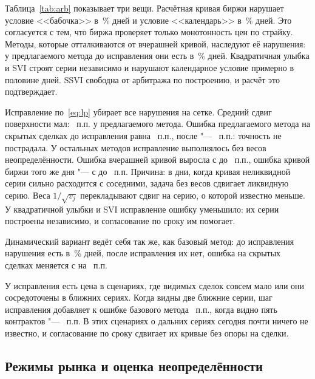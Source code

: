 \documentclass{article}
\begin{document}
Таблица~\ref{tab:arb} показывает три вещи. Расчётная кривая биржи нарушает условие <<бабочка>> в \,\% дней и условие <<календарь>> в \,\% дней. Это согласуется с тем, что биржа проверяет только монотонность цен по страйку. Методы, которые отталкиваются от вчерашней кривой, наследуют её нарушения: у предлагаемого метода до исправления они есть в \,\% дней. Квадратичная улыбка и SVI строят серии независимо и нарушают календарное условие примерно в половине дней. SSVI свободна от арбитража по построению, и расчёт это подтверждает.

Исправление по~\eqref{eq:lp} убирает все нарушения на сетке. Средний сдвиг поверхности мал: ~п.п. у предлагаемого метода. Ошибка предлагаемого метода на скрытых сделках до исправления равна ~п.п., после "--- ~п.п.: точность не пострадала. У остальных методов исправление выполнялось без весов неопределённости. Ошибка вчерашней кривой выросла с  до ~п.п., ошибка кривой биржи того же дня "--- с  до ~п.п. Причина: в дни, когда кривая неликвидной серии сильно расходится с соседними, задача без весов сдвигает ликвидную серию. Веса $1/\sqrt{v_j}$ перекладывают сдвиг на серию, о которой известно меньше. У квадратичной улыбки и SVI исправление ошибку уменьшило: их серии построены независимо, и согласование по сроку им помогает.

Динамический вариант ведёт себя так же, как базовый метод: до исправления нарушения есть в \,\% дней, после исправления их нет, ошибка на скрытых сделках меняется с  на ~п.п.

У исправления есть цена в сценариях, где видимых сделок совсем мало или они сосредоточены в ближних сериях. Когда видны две ближние серии, шаг исправления добавляет к ошибке базового метода ~п.п., когда видно пять контрактов "--- ~п.п. В этих сценариях о дальних сериях сегодня почти ничего не известно, и согласование по сроку сдвигает их кривые без опоры на сделки.

\subsection{Режимы рынка и оценка неопределённости}
\end{document}
